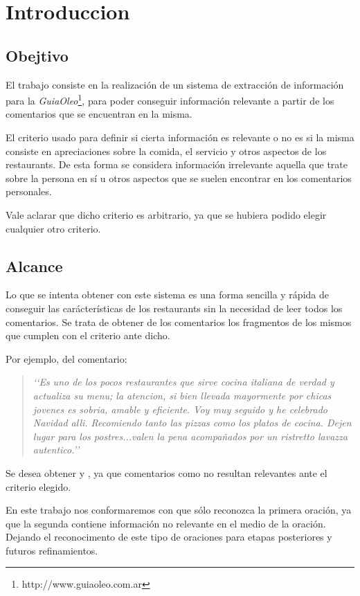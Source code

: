 \section{Introduccion}

\subsection{Obejtivo}

El trabajo consiste en la realización de un sistema de extracción de información para la \emph{GuiaOleo}\footnote{http://www.guiaoleo.com.ar}, para poder conseguir información relevante a partir de los comentarios que se encuentran en la misma.

El criterio usado para definir si cierta información es relevante o no es si la misma consiste en apreciaciones sobre la comida, el servicio y otros aspectos de los restaurants. De esta forma se considera información irrelevante aquella que trate sobre la persona en sí u otros aspectos  que se suelen encontrar en los comentarios personales.

Vale aclarar que dicho criterio es arbitrario, ya que se hubiera podido elegir cualquier otro criterio.

\subsection{Alcance}

Lo que se intenta obtener con este sistema es una forma sencilla y rápida de conseguir las carácterísticas de los restaurants sin la necesidad de leer todos los comentarios. Se trata de obtener de los comentarios los fragmentos de los mismos que cumplen con el criterio ante dicho.

Por ejemplo, del comentario:

\begin{quotation}
\emph{\lq\lq{}Es uno de los pocos restaurantes que sirve cocina italiana de verdad y actualiza su menu; la atencion, si bien llevada mayormente por chicas jovenes es sobria, amable y eficiente. Voy muy seguido y he celebrado Navidad alli. Recomiendo tanto las pizzas como los platos de cocina. Dejen lugar para los postres...valen la pena acompañados por un ristretto lavazza autentico.\rq\rq{}}
\end{quotation}

Se desea obtener  y , ya que comentarios como  no resultan relevantes ante el criterio elegido.

En este trabajo nos conformaremos con que sólo reconozca la primera oración, ya que la segunda contiene información no relevante en el medio de la oración. Dejando el reconocimento de este tipo de oraciones para etapas posteriores y futuros refinamientos.